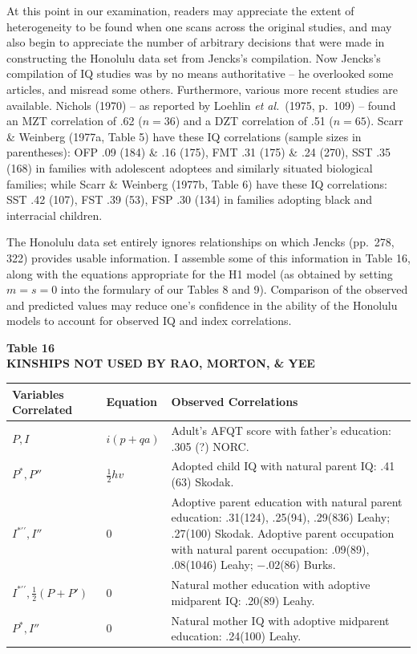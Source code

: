 ﻿\documentclass[12pt]{article}
\begin{document}
At this point in our examination, readers may appreciate the extent of heterogeneity to be found when one scans across the original studies, and may also begin to appreciate the number of arbitrary decisions that were made in constructing the Honolulu data set from Jencks's compilation. Now Jencks's compilation of IQ studies was by no means authoritative -- he overlooked some articles, and misread some others. Furthermore, various more recent studies are available. Nichols (1970) -- as reported by Loehlin \emph{et al.}\ (1975, p.\ 109) -- found an MZT correlation of .62 ($n=36$) and a DZT correlation of .51 ($n=65$). Scarr \& Weinberg (1977a, Table 5) have these IQ correlations (sample sizes in parentheses): OFP .09 (184) \& .16 (175), FMT .31 (175) \& .24 (270), SST .35 (168) in families with adolescent adoptees and similarly situated biological families; while Scarr \& Weinberg (1977b, Table 6) have these IQ correlations: SST .42 (107), FST .39 (53), FSP .30 (134) in families adopting black and interracial children.

The Honolulu data set entirely ignores relationships on which Jencks (pp.\ 278, 322) provides usable information. I assemble some of this information in Table 16, along with the equations appropriate for the H1 model (as obtained by setting $m=s=0$ into the formulary of our Tables 8 and 9). Comparison of the observed and predicted values may reduce one's confidence in the ability of the Honolulu models to account for observed IQ and index correlations.

\begin{center}
\textbf{Table 16}\\
\textbf{KINSHIPS NOT USED BY RAO, MORTON, \& YEE}
\end{center}
\begin{center}
\small
\begin{tabular}{l l p{6.5cm}}
\hline
Variables Correlated & Equation & Observed Correlations \\
\hline
$P, I$ & $i(p+qa)$ & Adult's AFQT score with father's education: .305 (?) NORC. \\
$P^*, P''$ & $\tfrac12 hv$ & Adopted child IQ with natural parent IQ: .41 (63) Skodak. \\
$I^{*\prime\prime}, I''$ & 0 & Adoptive parent education with natural parent education: .31(124), .25(94), .29(836) Leahy; .27(100) Skodak. Adoptive parent occupation with natural parent occupation: .09(89), .08(1046) Leahy; $-.02$(86) Burks. \\
$I^{*\prime\prime}, \tfrac12(P+P')$ & 0 & Natural mother education with adoptive midparent IQ: .20(89) Leahy. \\
$P^*, I''$ & 0 & Natural mother IQ with adoptive midparent education: .24(100) Leahy. \\
\hline
\end{tabular}
\end{center}
\end{document}
